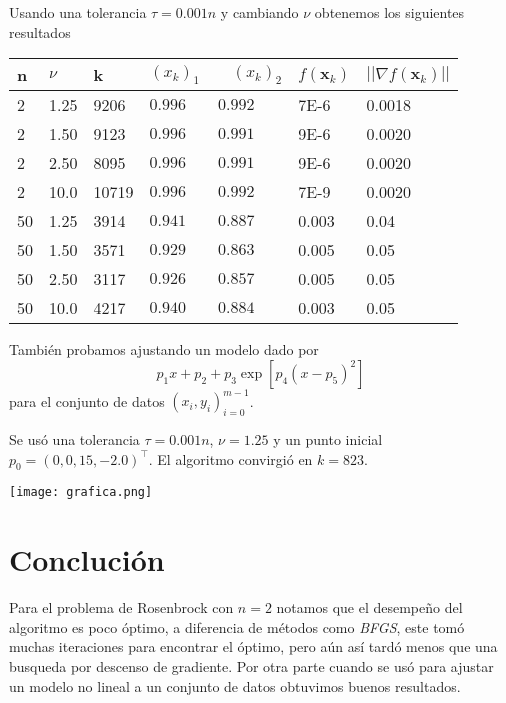 \documentclass{article}
\begin{document}
\begin{multicols}{2}
Usando una tolerancia $\tau = 0.001 n$ y cambiando $\nu$ obtenemos los siguientes resultados
\begin{table}[H]
\small
\centering
\label{my-label}
\begin{tabular}{|l|l|l|l|l|l|}
\hline
n & $\nu$ & k & $(x_{k})_1\qquad (x_{k})_2$ & $f(\boldsymbol{x}_k)$ & $||\nabla f(\boldsymbol{x}_k)||$ \\ \hline
2  & 1.25 & 9206  & $0.996\qquad0.992$ & 7E-6  & 0.0018 \\
2  & 1.50 & 9123  & $0.996\qquad0.991$ & 9E-6  & 0.0020 \\
2  & 2.50 & 8095  & $0.996\qquad0.991$ & 9E-6  & 0.0020 \\
2  & 10.0 & 10719 & $0.996\qquad0.992$ & 7E-9  & 0.0020 \\
50 & 1.25 & 3914  & $0.941\qquad0.887$ & 0.003 & 0.04 \\
50 & 1.50 & 3571  & $0.929\qquad0.863$ & 0.005 & 0.05 \\
50 & 2.50 & 3117  & $0.926\qquad0.857$ & 0.005 & 0.05 \\
50 & 10.0 & 4217  & $0.940\qquad0.884$ & 0.003 & 0.05 \\ \hline
\end{tabular}
\end{table}

También probamos ajustando un modelo dado por
$$ p_1x + p_2 + p_3 \exp[p_4(x - p_5)^2] $$
para el conjunto de datos ${(x_i, y_i)}_{i=0}^{m-1}$.

Se usó una tolerancia $\tau = 0.001 n$, $\nu = 1.25$ y un punto inicial $p_0 = (0, 0, 15, -2.0)^\intercal$. El algoritmo convirgió en $k = 823$.

\texttt{[image: grafica.png]}

\section{Conclución}

Para el problema de Rosenbrock con $n = 2$ notamos que el desempeño del algoritmo es poco óptimo, a diferencia de métodos como \emph{BFGS}, este tomó muchas iteraciones para encontrar el óptimo, pero aún así tardó menos que una busqueda por descenso de gradiente. Por otra parte cuando se usó para ajustar un modelo no lineal a un conjunto de datos obtuvimos buenos resultados.


\newpage

\end{multicols}
\end{document}
